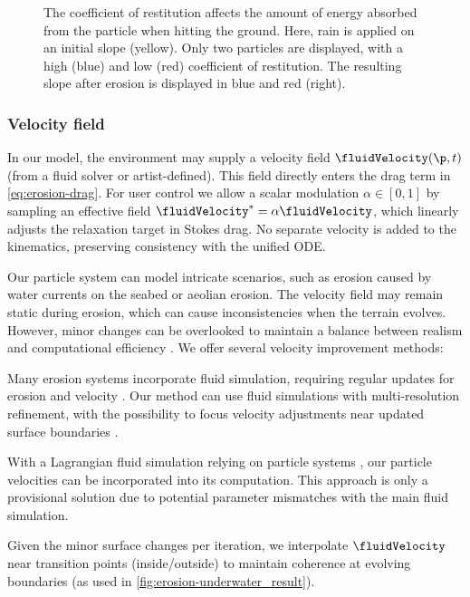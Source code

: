 \begin{figure}
    \caption{The coefficient of restitution affects the amount of energy absorbed from the particle when hitting the ground. Here, rain is applied on an initial slope (yellow). Only two particles are displayed, with a high (blue) and low (red) coefficient of restitution. The resulting slope after erosion is displayed in blue and red (right).}
    \label{fig:erosion-coefficient of restitution-diagram}
\end{figure}

\subsubsection{Velocity field}
\label{sec:erosion-velocity_field_refinement}

In our model, the environment may supply a velocity field $\fluidVelocity(\p,t)$ (from a fluid solver or artist-defined). This field directly enters the drag term in \cref{eq:erosion-drag}. For user control we allow a scalar modulation $\alpha\in[0,1]$ by sampling an effective field $\fluidVelocity^* = \alpha\fluidVelocity$, which linearly adjusts the relaxation target in Stokes drag. No separate velocity is added to the kinematics, preserving consistency with the unified ODE.

Our particle system can model intricate scenarios, such as erosion caused by water currents on the seabed or aeolian erosion. The velocity field may remain static during erosion, which can cause inconsistencies when the terrain evolves. However, minor changes can be overlooked to maintain a balance between realism and computational efficiency \cite{Tychonievich2010}. We offer several velocity improvement methods: 
\begin{Itemize}
     Many erosion systems incorporate fluid simulation, requiring regular updates for erosion and velocity \cite{Kristof2009, Wojtan2007}. Our method can use fluid simulations with multi-resolution refinement, with the possibility to focus velocity adjustments near updated surface boundaries \cite{Roose2011}. 
    
     With a Lagrangian fluid simulation relying on particle systems \cite{Koschier2022}, our particle velocities can be incorporated into its computation. This approach is only a provisional solution due to potential parameter mismatches with the main fluid simulation. 

     Given the minor surface changes per iteration, we interpolate $\fluidVelocity$ near transition points (inside/outside) to maintain coherence at evolving boundaries (as used in \cref{fig:erosion-underwater_result}).
\end{Itemize}

